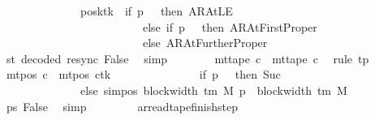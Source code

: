 \begin{isabellebody}
\ \ \ \ \ \ \ \ \ \ \ \ \ \ posk{\isacharparenleft}{\kern0pt}tk\ {\isacharcolon}{\kern0pt}{\isacharequal}{\kern0pt}\ if\ p\ {\isacharequal}{\kern0pt}\ {}\ then\ AR{\isacharunderscore}{\kern0pt}AtLE\isanewline
\ \ \ \ \ \ \ \ \ \ \ \ \ \ \ \ \ \ \ \ \ \ \ \ \ else\ if\ p\ {\isacharequal}{\kern0pt}\ {}\ then\ AR{\isacharunderscore}{\kern0pt}AtFirstProper\isanewline
\ \ \ \ \ \ \ \ \ \ \ \ \ \ \ \ \ \ \ \ \ \ \ \ \ else\ AR{\isacharunderscore}{\kern0pt}AtFurtherProper{\isacharparenright}{\kern0pt}{\isacharparenright}{\kern0pt}{\isachardoublequoteclose}\isanewline
\ \ \ \ \ \ \ \ \isamarkupfalse%
\ st\ decoded\ resync\ False\ \isamarkupfalse%
\ simp\isanewline
\ \ \ \ \ \ \isamarkupfalse%
\ {\isachardoublequoteopen}mt{\isacharunderscore}{\kern0pt}tape\ c{\isacharprime}{\kern0pt}{\isacharprime}{\kern0pt}\ {\isacharequal}{\kern0pt}\ mt{\isacharunderscore}{\kern0pt}tape\ c{\isacharprime}{\kern0pt}{\isachardoublequoteclose}\ \isamarkupfalse%
\ {\isacharparenleft}{\kern0pt}rule\ tp{\isacharparenright}{\kern0pt}\isanewline
\ \ \ \ \ \ \isamarkupfalse%
\ {\isachardoublequoteopen}mt{\isacharunderscore}{\kern0pt}pos\ c{\isacharprime}{\kern0pt}{\isacharprime}{\kern0pt}\ {\isacharequal}{\kern0pt}\ {\isacharparenleft}{\kern0pt}mt{\isacharunderscore}{\kern0pt}pos\ c{\isacharprime}{\kern0pt}{\isacharparenright}{\kern0pt}{\isacharparenleft}{\kern0pt}tk\ {\isacharcolon}{\kern0pt}{\isacharequal}{\kern0pt}\isanewline
\ \ \ \ \ \ \ \ \ \ \ \ \ \ if\ p\ {\isacharequal}{\kern0pt}\ {}\ then\ Suc\ {}\isanewline
\ \ \ \ \ \ \ \ \ \ \ \ \ \ else\ sim{\isacharunderscore}{\kern0pt}pos\ {\isacharparenleft}{\kern0pt}block{\isacharunderscore}{\kern0pt}width\ {\isacharparenleft}{\kern0pt}{\isasymGamma}{\isacharunderscore}{\kern0pt}tm\ M{\isacharparenright}{\kern0pt}{\isacharparenright}{\kern0pt}\ p\ {\isacharplus}{\kern0pt}\ block{\isacharunderscore}{\kern0pt}width\ {\isacharparenleft}{\kern0pt}{\isasymGamma}{\isacharunderscore}{\kern0pt}tm\ M{\isacharparenright}{\kern0pt}{\isacharparenright}{\kern0pt}{\isachardoublequoteclose}\isanewline
\ \ \ \ \ \ \ \ \isamarkupfalse%
\ ps\ False\ \isamarkupfalse%
\ simp\isanewline
\ \ \ \ \isamarkupfalse%
\isanewline
\ \ \isamarkupfalse%
\isanewline
{}\isamarkupfalse%
%
\endisatagproof
{\isafoldproof}%
%
\isadelimproof
\isanewline
%
\endisadelimproof
\isanewline
{}\isamarkupfalse%
\ ar{\isacharunderscore}{\kern0pt}read{\isacharunderscore}{\kern0pt}tape{\isacharunderscore}{\kern0pt}finish{\isacharunderscore}{\kern0pt}step{\isacharcolon}{\kern0pt}\isanewline

\end{isabellebody}
